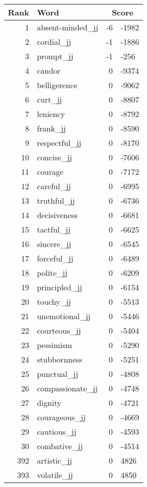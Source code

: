 \begin{longtable}[!htbp]{| rlr@{.}l |}
    \hline
    \textbf{Rank} & \textbf{Word} & \multicolumn{2}{c|}{\textbf{Score}} \\
    \hline
    \endhead
    1 & absent-minded\_jj & -6 & -1982 \\
    2 & cordial\_jj & -1 & -1886 \\
    3 & prompt\_jj & -1 & -256 \\
    4 & candor & 0 & -9374 \\
    5 & belligerence & 0 & -9062 \\
    6 & curt\_jj & 0 & -8807 \\
    7 & leniency & 0 & -8792 \\
    8 & frank\_jj & 0 & -8590 \\
    9 & respectful\_jj & 0 & -8170 \\
    10 & concise\_jj & 0 & -7606 \\
    11 & courage & 0 & -7172 \\
    12 & careful\_jj & 0 & -6995 \\
    13 & truthful\_jj & 0 & -6736 \\
    14 & decisiveness & 0 & -6681 \\
    15 & tactful\_jj & 0 & -6625 \\
    16 & sincere\_jj & 0 & -6545 \\
    17 & forceful\_jj & 0 & -6489 \\
    18 & polite\_jj & 0 & -6209 \\
    19 & principled\_jj & 0 & -6154 \\
    20 & touchy\_jj & 0 & -5513 \\
    21 & unemotional\_jj & 0 & -5446 \\
    22 & courteous\_jj & 0 & -5404 \\
    23 & pessimism & 0 & -5290 \\
    24 & stubbornness & 0 & -5251 \\
    25 & punctual\_jj & 0 & -4808 \\
    26 & compassionate\_jj & 0 & -4748 \\
    27 & dignity & 0 & -4721 \\
    28 & courageous\_jj & 0 & -4669 \\
    29 & cautious\_jj & 0 & -4593 \\
    30 & combative\_jj & 0 & -4514 \\
    392 & artistic\_jj & 0 & 4826 \\
    393 & volatile\_jj & 0 & 4850 \\

\end{longtable}
